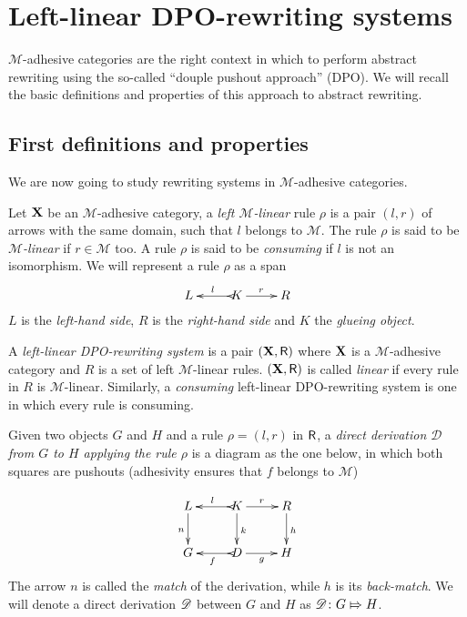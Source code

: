 \chapter{Left-linear DPO-rewriting systems}

$\mathcal{M}$-adhesive categories are the right context in which to perform abstract rewriting using the so-called ``douple pushout approach'' (DPO). We will recall the basic definitions and properties of this approach to abstract rewriting. 
\section{First definitions and properties}
We are now going to study rewriting systems in $\mathcal{M}$-adhesive categories.

\begin{definition}
	Let $\textbf {\textup{X}}$ be an $\mathcal{M}$-adhesive category, a  \emph{left $\mathcal{M}$-linear} rule $\rho$ is a pair $(l,r)$ of arrows with the same domain, such that $l$ belongs to $\mathcal{M}$.  The rule $\rho$ is said to be \emph{$\mathcal{M}$-linear} if $r\in \mathcal{M}$ too. A rule $\rho$ is said to be \emph{consuming} if $l$ is not an isomorphism. We will represent a rule $\rho$ as a span 
	\[\xymatrix{L & K\ar@{>->}[l]_{l} \ar[r]^{r} & R}\]
	$L$ is the \emph{left-hand side}, $R$ is the \emph{right-hand side} and $K$ the \emph{glueing object}. 
	
	
	A \emph{left-linear DPO-rewriting system} is a pair $(\textbf {\textup{X}}, \mathsf{R})$ where $\textbf {\textup{X}}$ is a $\mathcal{M}$-adhesive category and $R$ is a set of left $\mathcal{M}$-linear rules. $(\textbf {\textup{X}}, \mathsf{R})$ is called \emph{linear} if every rule in $R$ is $\mathcal{M}$-linear. Similarly, a \emph{consuming} left-linear DPO-rewriting system is one in which every rule is consuming.
	
	Given  two objects $G$ and $H$ and a rule $\rho=(l,r)$ in $\mathsf{R}$, a \emph{direct derivation $\mathscr{D}$ from $G$ to $H$ applying the rule $\rho$} is a diagram as the one below, in which both squares are pushouts
	(adhesivity ensures that $f$ belongs to $\mathcal{M}$)
	  
	\[\xymatrix{L \ar[d]_{n}& K \ar[d]^{k}\ar@{>->}[l]_{l} \ar[r]^{r} & R \ar[d]^{h}\\G & \ar@{>->}[l]^{f} D \ar[r]_{g}& H}\]
	The arrow $n$ is called the \emph{match} of the derivation, while $h$ is its \emph{back-match}.
	We will denote a direct derivation $\mathscr{D}$ between $G$ and $H$ as $\mathscr{D}\colon G\Mapsto H$. 
\end{definition}


